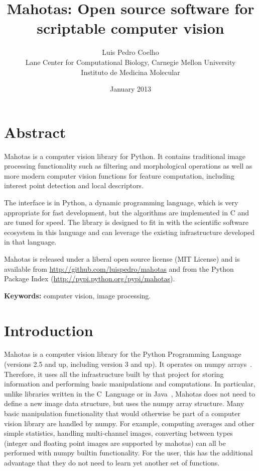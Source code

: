 \documentclass{scrartcl}
\title{Mahotas: Open source software for scriptable computer vision}
\author{Luis Pedro Coelho\\
Lane Center for Computational Biology, Carnegie Mellon University\\
Instituto de Medicina Molecular}
\date{January 2013}
\newcommand*{\cpp}{{C\nolinebreak[4]\hspace{-.05em}\raisebox{.4ex}{\tiny\textbf{++}}}}
\begin{document}
\maketitle

\section*{Abstract}
Mahotas is a computer vision library for Python. It contains traditional image
processing functionality such as filtering and morphological operations as well
as more modern computer vision functions for feature computation, including
interest point detection and local descriptors.

The interface is in Python, a dynamic programming language, which is very
appropriate for fast development, but the algorithms are implemented in \cpp{}
and are tuned for speed. The library is designed to fit in with the scientific
software ecosystem in this language and can leverage the existing
infrastructure developed in that language.

Mahotas is released under a liberal open source license (MIT License) and is
available from \url{http://github.com/luispedro/mahotas} and from the Python Package
Index (\url{http://pypi.python.org/pypi/mahotas}).

\textbf{Keywords:} computer vision, image processing.

\section{Introduction}

Mahotas is a computer vision library for the Python Programming Language
(versions 2.5 and up, including version 3 and up). It operates on numpy
arrays~\citep{numpystructure}. Therefore, it uses all the infrastructure built
by that project for storing information and performing basic manipulations and
computations. In particular, unlike libraries written in the C~Language or in
Java~\citep{Marcel:2010:TMP:1873951.1874254}, Mahotas does not need to define a
new image data structure, but uses the numpy array structure. Many basic
manipulation functionality that would otherwise be part of a computer vision
library are handled by numpy. For example, computing averages and other simple
statistics, handling multi-channel images, converting between types (integer
and floating point images are supported by mahotas) can all be performed with
numpy builtin functionality. For the user, this has the additional advantage
that they do not need to learn yet another set of functions.
\end{document}
